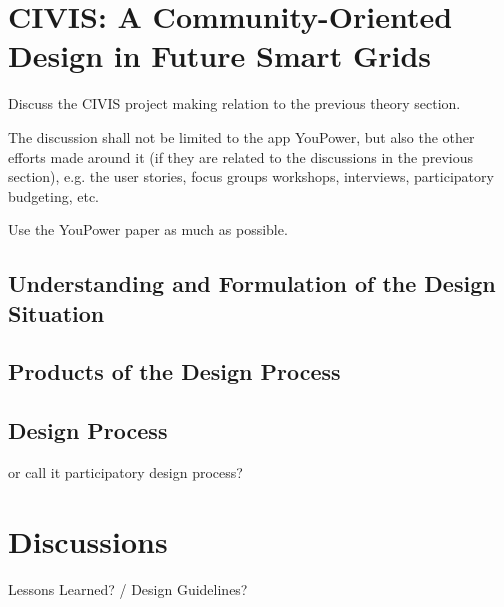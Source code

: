\section{CIVIS: A Community-Oriented Design in Future Smart Grids}

\begin{svgraybox}
Discuss the CIVIS project making relation to the previous theory section. 

The discussion shall not be limited to the app YouPower, but also the other efforts made around it (if they are related to the discussions in the previous section), e.g. the user stories, focus groups workshops, interviews, participatory budgeting, etc. 

Use the YouPower paper as much as possible. 
\end{svgraybox}

\subsection{Understanding and Formulation of the Design Situation}

\subsection{Products of the Design Process}

\subsection{Design Process}

or call it participatory design process? 

\section{Discussions}

\begin{svgraybox}
Lessons Learned?  / Design Guidelines? 
\end{svgraybox}